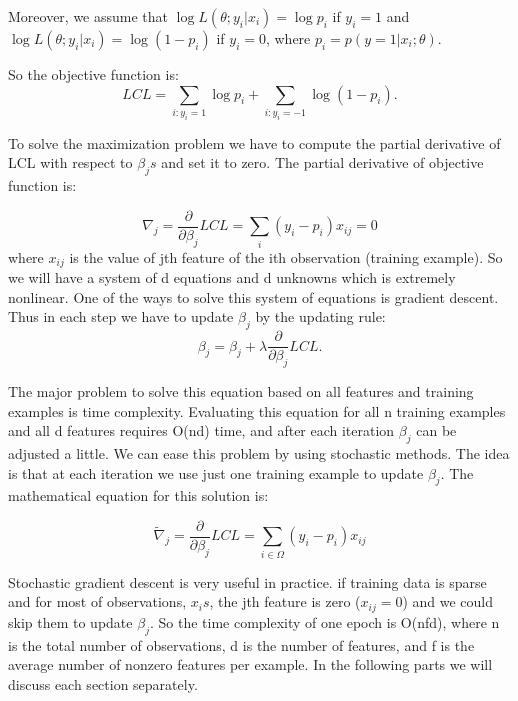 \documentclass[twoside,12pt]{article}
\begin{document}
Moreover, we assume that $\log L(\theta;y_i|x_i)= \log p_i$ if $y_i=1$ and $\log L(\theta;y_i|x_i)=\log(1-p_i)$ if $y_i=0$, where $p_i = p(y=1|x_i;\theta).$
 
So the objective function is:
\begin{equation}
LCL=\sum_{i:y_i=1} \log p_i +\sum_{i:y_i=-1} \log (1-p_i).
\label{eq:LCL}
\end{equation}

To solve the maximization problem we have to compute the partial derivative of LCL with respect to $\beta_js$ and set it to zero. The partial derivative of objective function is:

\begin{equation}
\nabla_j=\frac{\partial}{\partial \beta_j}LCL=\sum_{i} (y_i-p_i)x_{ij}=0
\label{eq:pLCL}
\end{equation}
 where $x_{ij}$ is the value of jth feature of the ith observation (training example). So we will have a system of d equations and d unknowns which is extremely nonlinear. One of the ways to solve this system of equations is gradient descent. Thus in each step we have to update $\beta_j$ by the updating rule:
 \begin{equation}
 \beta_j=\beta_j+\lambda \frac{\partial}{\partial \beta_j}LCL.
 \end{equation}
 
 The major problem to solve this equation based on all features and training examples is time complexity. Evaluating this equation for all n training examples and all d features requires O(nd) time, and after each iteration $\beta_j$  can be adjusted a little. We can ease this problem by using stochastic methods. The idea is that at each iteration we use just one training example to update $\beta_j$. The mathematical equation for this solution is:

\begin{equation}
\tilde{\nabla}_j=\frac{\partial}{\partial \beta_j}LCL=\sum_{i \in \Omega} (y_i-p_i)x_{ij}
\label{eq:pLCL}
\end{equation}

Stochastic gradient descent is very useful in practice. if training data is sparse and for most of observations, $x_is$, the jth feature is zero ($x_{ij}=0$) and we could skip them to update $\beta_j$. So the time complexity of one epoch is O(nfd), where n is the total number of observations, d is the number of features, and f is the average number of nonzero features per example. In the following parts we will discuss each section separately. 
\end{document}

